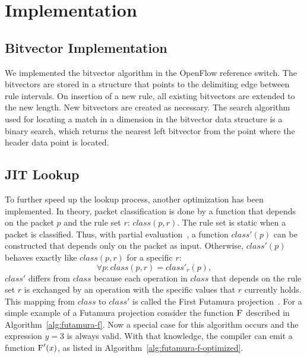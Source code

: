\documentclass[conference]{IEEEtran}
\begin{document}

\section{Implementation}
\subsection{Bitvector Implementation}
We implemented the bitvector algorithm in the OpenFlow reference switch.
The bitvectors are stored in a structure that points to the delimiting edge
between rule intervals.
On insertion of a new rule, all existing bitvectors are extended to the new length.
New bitvectors are created as necessary.
The search algorithm used for locating a match in a dimension in the bitvector 
data structure is a binary search, which returns the nearest left bitvector from the point where 
the header data point is located.

\subsection{JIT Lookup}
To further speed up the lookup process, another optimization has been implemented.
In theory, packet classification is done by a function that depends on the packet $p$ and the rule set $r$: $class(p, r)$.
The rule set is static when a packet is classified.
Thus, with partial evaluation~\cite{partial_eval}, a function $class'(p)$ can be constructed that depends only on the packet as input.
Otherwise, $class'(p)$ behaves exactly like $class(p, r)$ for a specific $r$:
$$\forall p: class(p, r) = class'_r(p),$$
$class'$ differs from $class$ because each operation in $class$ that depends on the 
rule set $r$ is exchanged by an operation with the specific values that $r$ currently holds.
This mapping from $class$ to $class'$ is called the First Futamura projection~\cite{DBLP:journals/ngc/MogensenH88}.
For a simple example of a Futamura projection consider the function $\textsc{F}$ described in Algorithm~\ref{alg:futamura-f}.
Now a special case for this algorithm occurs and the expression $y = 3$ is always valid.
With that knowledge, the compiler can emit a function $\textsc{F}'(x)$, as listed in Algorithm~\ref{alg:futamura-f-optimized}.
\end{document}
